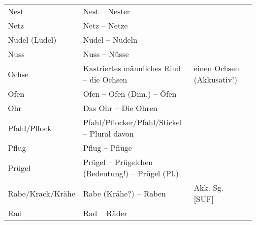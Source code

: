 {\begin{xltabular}{\textwidth}{>{\raggedright\arraybackslash}p{.15\textwidth}QQQ}
Nest & Nest -- Nester &  & \\
Netz & Netz -- Netze &  & \\
Nudel (Ludel) & Nudel -- Nudeln &  & \\
Nuss & Nuss -- Nüsse &  & \\
Ochse & Kastriertes männliches Rind -- die Ochsen & einen Ochsen (Akkusativ!) & \\
Ofen & Ofen -- Ofen (Dim.) -- Öfen &  & \\
Ohr & Das Ohr -- Die Ohren &  & \\
Pfahl\slash Pflock & Pfahl\slash Pflocker\slash Pfahl\slash Stickel -- Plural davon &  & \\
Pflug & Pflug -- Pflüge &  & \\
Prügel & Prügel -- Prügelchen (Bedeutung!) -- Prügel (Pl.) &  & \\
Rabe\slash Krack\slash Krähe & Rabe (Krähe?) -- Raben & Akk. Sg. [SUF] & \\
Rad & Rad -- Räder


\end{xltabular}}
